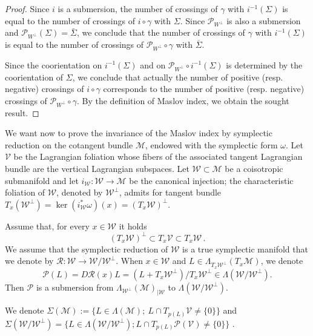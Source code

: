 \documentclass[AHL, Unicode, longabstracts, published]{cedram}
\renewcommand*\P{\mathcal{P}}
\newcommand*\M{\mathcal{M}}
\newcommand*\cw{\mathcal{W}}
\newcommand*\cv{\mathcal{V}}
\newcommand*\cal{\mathcal}
\begin{document}
\begin{proof}
Since $i$ is a submersion, the number of crossings of $\gamma$ with $ i^{-1}({ \Sigma})$ is equal to the number of crossings of $i\circ\gamma$ with ${ \Sigma}$. {Since $\P_{W^\perp}$ is also a submersion and $\P_{W^\perp}(\Sigma)=\bar\Sigma$}, we conclude that the number of crossings of $\gamma$ with $ i^{-1}({ \Sigma})$ is equal to the number of crossings of $\P_{W^\perp}\circ\gamma$ with ${ \overline{\Sigma}}$.

Since the coorientation on $i^{-1}(\Sigma)$ and on $\P_{W^\perp}\circ i^{-1}(\Sigma)$ is determined by the coorientation of $\Sigma$, we conclude that actually the number of positive (resp. negative) crossings of $i\circ\gamma$ corresponds to the number of positive (resp. negative) crossings of $\P_{W^\perp}\circ\gamma$. By the definition of Maslov index, we obtain the sought result.
\end{proof}

We want now to prove the invariance of the Maslov index by symplectic reduction on the cotangent bundle $\M$, endowed with the symplectic form $\omega$. Let $\cv$ be the Lagrangian foliation whose fibers of the associated tangent Lagrangian bundle are the vertical Lagrangian subspaces. Let $\cal W\subset \M$ be a coisotropic submanifold {and let $i_\cw:\cal W\to\M$ be the canonical injection}; the characteristic foliation of $\cal W$,  denoted by $\cal W^\bot$, admits for tangent bundle ${T_x(\cal W^\bot)=}\ker(i^*_\cw\omega)(x)=(T_x\cal W)^\perp$.


Assume that, for every $x\in { \cal W}$ it holds
\[
(T_x\cal W)^\perp\subset T_x\cv\subset T_x\cal W\,.
\]
We assume that the symplectic reduction of $\cal W$ is a true symplectic manifold that we denote by $\cal R: \cal W\to \cal W/\cal W^\bot$. When $x\in\cal W$ and $L\in \Lambda_{T_x\cal W^\bot}(T_x\M)$, we denote
\[
\P(L)=D\cal R(x)L=\left(L+T_x\cal W^\bot\right)/T_x\cal W^\bot\in \Lambda\left(\cal W/\cal W^\bot\right).
\]
Then $\P$ is a submersion from $\Lambda_{\cal W^\bot}(\M)_{|\cal W}$ to $\Lambda(\cw/\cal W^\bot)$.



We denote $\Sigma(\M):= \{ L\in \Lambda(\M) ;\ L\cap T_{p(L)}\cv\neq \{0\} \}$ and $\Sigma(\cal W/\cal W^\bot)=\{ L\in \Lambda(\cal W/\cal W^\bot); L\cap T_{p(L)}\P(\cal V)\neq \{ 0\}\}$ .
\end{document}
